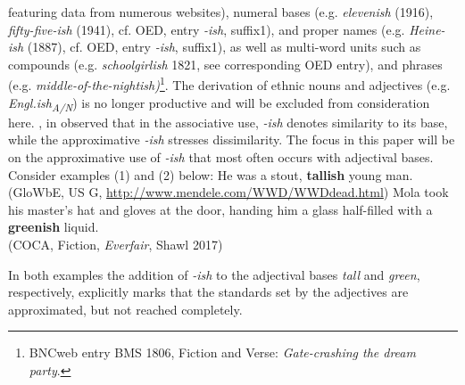 \documentclass[output=paper]{langsci/langscibook}
\begin{document}
featuring data from numerous websites), numeral bases (e.g.  \textit{elevenish} (1916),  \textit{fifty-five-ish} (1941), cf. OED, entry \textit{-ish}, suffix1), and proper names (e.g.  \textit{Heine-ish} (1887), cf. OED, entry \textit{-ish}, suffix1), as well as multi-word units such as compounds (e.g.  \textit{schoolgirlish} 1821, see corresponding OED entry), and phrases (e.g.  \textit{middle-of-the-nightish)}\footnote{BNCweb entry \cite{BNCweb} BMS 1806, Fiction and Verse: \textit{Gate-crashing the dream party}.}. The derivation of ethnic nouns and adjectives (e.g.  \textit{Engl.ish\textsubscript{A/N}}) is no longer productive and will be excluded from consideration here. \textcite{Kuzmack2007}, in \textcite*[234]{Traugott2013} observed that in the associative use,  \textit{-ish} denotes similarity to its base, while the approximative  \textit{-ish} stresses dissimilarity. The focus in this paper will be on the approximative use of  \textit{-ish} that most often occurs with adjectival bases. Consider examples (1) and (2) below:
\ea
	He was a stout, \textbf{tallish} young man. \\ (GloWbE, US G, \url{http://www.mendele.com/WWD/WWDdead.html})
\z
\ea
	Mola took his master's hat and gloves at the door, handing him a glass half-filled with a \textbf{greenish} liquid. \\ (COCA, Fiction, \textit{Everfair}, Shawl 2017)
\z

In both examples the addition of \textit{-ish} to the adjectival bases  \textit{tall} and  \textit{green}, respectively, explicitly marks that the standards set by the adjectives are approximated, but not reached completely.
\end{document}
